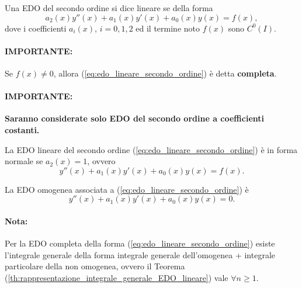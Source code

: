 \begin{definition}\label{def:edo_lineare_secondo_ordine}
    Una EDO del secondo ordine si dice lineare se della forma
    \begin{equation}\label{eq:edo_lineare_secondo_ordine}
        a_2(x)y''(x)+a_1(x)y'(x)+a_0(x)y(x) = f(x),
    \end{equation}
    dove i coefficienti $a_i(x),\, i=0,1,2$ ed il termine noto $f(x)$ sono $C^0(I)$.
\end{definition}

\paragraph{IMPORTANTE:} Se $f(x)\neq 0$, allora (\ref{eq:edo_lineare_secondo_ordine}) è detta \textbf{completa}.

\paragraph{IMPORTANTE:} \textbf{Saranno considerate solo EDO del secondo ordine a coefficienti costanti.}

\begin{definition}
    La EDO lineare del secondo ordine (\ref{eq:edo_lineare_secondo_ordine}) è in forma normale se $a_2(x)=1$, ovvero
    \begin{equation}\label{eq:edo_lineare_secondo_ordine_forma_normale}
        y''(x)+a_1(x)y'(x)+a_0(x)y(x) = f(x).
    \end{equation}
\end{definition}

\begin{definition}
    La EDO omogenea associata a (\ref{eq:edo_lineare_secondo_ordine}) è
    \begin{equation}\label{eq:edo_omogenea_associata_lineare_secondo_ordine}
        y''(x)+a_1(x)y'(x)+a_0(x)y(x) = 0.
    \end{equation}
\end{definition}

\paragraph{Nota:} Per la EDO completa della forma (\ref{eq:edo_lineare_secondo_ordine}) esiste l'integrale generale della forma integrale generale dell'omogenea + integrale particolare della non omogenea, ovvero il Teorema (\ref{th:rappresentazione_integrale_generale_EDO_lineare}) vale $\forall n\geq1$.

